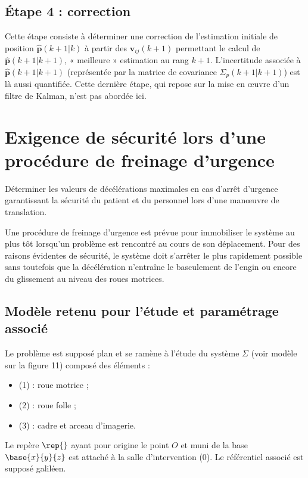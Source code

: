 
\subsection*{Étape 4 : correction}

Cette étape consiste à déterminer une correction de l’estimation initiale de position $\hat{\bm{p}}(k + 1|k)$  à partir
des $\bm{v}_{ij}(k + 1)$ permettant le calcul de $\hat{\bm{p}}(k + 1|k+1)$, « meilleure » estimation au rang $k+1$. L’incertitude
associée à $\hat{\bm{p}}(k + 1|k+1)$ (représentée par la matrice de covariance $\Sigma_p(k+1|k+1)$) est là aussi quantifiée.
Cette dernière étape, qui repose sur la mise en œuvre d’un filtre de Kalman, n’est pas abordée ici.


\section{\label{sec:03}Exigence de sécurité lors d’une procédure de freinage d’urgence}
\begin{obj}
Déterminer les valeurs de décélérations maximales en cas d’arrêt d’urgence garantissant la
sécurité du patient et du personnel lors d’une manœuvre de translation.
\end{obj}

Une procédure de freinage d’urgence est prévue pour immobiliser le système au plus tôt lorsqu’un
problème est rencontré au cours de son déplacement. Pour des raisons évidentes de sécurité, le système doit s’arrêter le plus rapidement possible sans toutefois que la décélération n’entraîne le basculement de l’engin ou encore du glissement au niveau des roues motrices.

\subsection{Modèle retenu pour l’étude et paramétrage associé}

Le problème est supposé plan et se ramène à l’étude
du système $\Sigma$ (voir modèle sur la figure 11) composé
des éléments :
\begin{itemize}
\item (1) : roue motrice ;
\item (2) : roue folle ;
\item (3) : cadre et arceau d’imagerie.
\end{itemize}
Le repère $\rep{}$ ayant pour origine le point $O$ et muni de la
base $\base{x}{y}{z}$ est attaché à la salle d’intervention (0).
Le référentiel associé est supposé galiléen.

